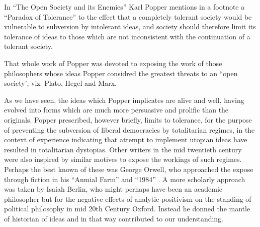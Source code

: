 \documentclass[10pt,titlepage]{book}
\begin{document}
In ``The Open Society and its Enemies'' Karl Popper mentions in a footnote a ``Paradox of Tolerance'' to the effect that a completely tolerant society would be vulnerable to subversion by intolerant ideas, and society should therefore limit its tolerance of ideas to those which are not inconsistent with the continuation of a tolerant society.

That whole work of Popper was devoted to exposing the work of those philosophers whose ideas Popper considred the greatest threats to an ``open society', viz. Plato, Hegel and Marx.

As we have seen, the ideas which Popper implicates are alive and well, having evolved into forms which are much more persuasive and prolific than the originals.
Popper prescribed, however briefly, limits to tolerance, for the purpose of preventing the subversion of liberal democracies by totalitarian regimes, in the context of experience indicating that attempt to implement utopian ideas have resulted in totalitarian dystopias.
Other writers in the mid twentieth century were also inspired by similar motives to expose the workings of such regimes.
Perhaps the best known of these was George Orwell, who approached the expose through fiction in his ``Anmial Farm'' and ``1984'' \cite{orwell-af,orwell-1984,orwell-fd}.
A more scholarly approach was taken by Isaiah Berlin, who might perhaps have been an academic philosopher but for the negative effects of analytic positivism on the standing of political philosophy in mid 20th Century Oxford.
Instead he donned the mantle of historian of ideas and in that way contributed to our understanding.
 
\backmatter


{}








\end{document}
